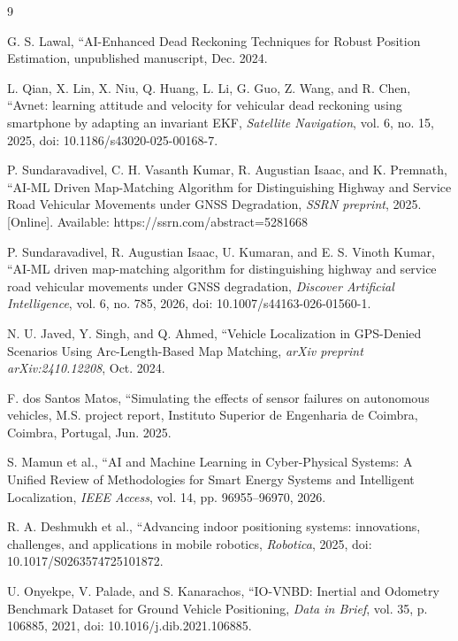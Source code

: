 \documentclass[conference]{IEEEtran}
\begin{document}
\begin{thebibliography}{9}

 G. S. Lawal, ``AI-Enhanced Dead Reckoning Techniques for Robust Position Estimation, unpublished manuscript, Dec. 2024.

 L. Qian, X. Lin, X. Niu, Q. Huang, L. Li, G. Guo, Z. Wang, and R. Chen, ``Avnet: learning attitude and velocity for vehicular dead reckoning using smartphone by adapting an invariant EKF, \emph{Satellite Navigation}, vol. 6, no. 15, 2025, doi: 10.1186/s43020-025-00168-7.

 P. Sundaravadivel, C. H. Vasanth Kumar, R. Augustian Isaac, and K. Premnath, ``AI-ML Driven Map-Matching Algorithm for Distinguishing Highway and Service Road Vehicular Movements under GNSS Degradation, \emph{SSRN preprint}, 2025. [Online]. Available: https://ssrn.com/abstract=5281668

 P. Sundaravadivel, R. Augustian Isaac, U. Kumaran, and E. S. Vinoth Kumar, ``AI-ML driven map-matching algorithm for distinguishing highway and service road vehicular movements under GNSS degradation, \emph{Discover Artificial Intelligence}, vol. 6, no. 785, 2026, doi: 10.1007/s44163-026-01560-1.

 N. U. Javed, Y. Singh, and Q. Ahmed, ``Vehicle Localization in GPS-Denied Scenarios Using Arc-Length-Based Map Matching, \emph{arXiv preprint arXiv:2410.12208}, Oct. 2024.

 F. dos Santos Matos, ``Simulating the effects of sensor failures on autonomous vehicles, M.S. project report, Instituto Superior de Engenharia de Coimbra, Coimbra, Portugal, Jun. 2025.

 S. Mamun et al., ``AI and Machine Learning in Cyber-Physical Systems: A Unified Review of Methodologies for Smart Energy Systems and Intelligent Localization, \emph{IEEE Access}, vol. 14, pp. 96955--96970, 2026.

 R. A. Deshmukh et al., ``Advancing indoor positioning systems: innovations, challenges, and applications in mobile robotics, \emph{Robotica}, 2025, doi: 10.1017/S0263574725101872.

 U. Onyekpe, V. Palade, and S. Kanarachos, ``IO-VNBD: Inertial and Odometry Benchmark Dataset for Ground Vehicle Positioning, \emph{Data in Brief}, vol. 35, p. 106885, 2021, doi: 10.1016/j.dib.2021.106885.

\end{thebibliography}
\end{document}
